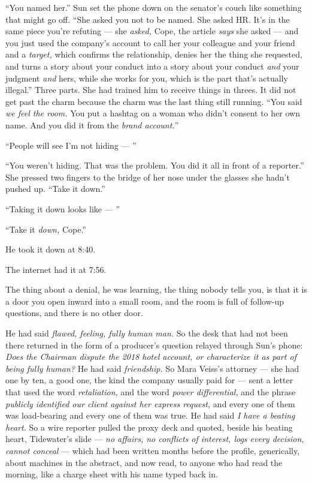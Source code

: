 \documentclass[11pt,openany]{book}
\newcommand{\scenebreak}{\par\vspace{0.5\baselineskip}\begin{center}\textasteriskcentered\quad\textasteriskcentered\quad\textasteriskcentered\end{center}\vspace{0.5\baselineskip}\par}
\begin{document}
``You named her.'' Sun set the phone down on the senator's couch like something that might go off. ``She asked you not to be named. She asked HR. It's in the same piece you're refuting --- she \textit{asked,} Cope, the article \textit{says} she asked --- and you just used the company's account to call her your colleague and your friend and a \textit{target,} which confirms the relationship, denies her the thing she requested, and turns a story about your conduct into a story about your conduct \textit{and} your judgment \textit{and} hers, while she works for you, which is the part that's actually illegal.'' Three parts. She had trained him to receive things in threes. It did not get past the charm because the charm was the last thing still running. ``You said \textit{we feel the room.} You put a hashtag on a woman who didn't consent to her own name. And you did it from the \textit{brand account.}''

``People will see I'm not hiding --- ''

``You weren't hiding. That was the problem. You did it all in front of a reporter.'' She pressed two fingers to the bridge of her nose under the glasses she hadn't pushed up. ``Take it down.''

``Taking it down looks like --- ''

``Take it \textit{down,} Cope.''

He took it down at 8:40.

The internet had it at 7:56.


\scenebreak


The thing about a denial, he was learning, the thing nobody tells you, is that it is a door you open inward into a small room, and the room is full of follow-up questions, and there is no other door.

He had said \textit{flawed, feeling, fully human man.} So the desk that had not been there returned in the form of a producer's question relayed through Sun's phone: \textit{Does the Chairman dispute the 2018 hotel account, or characterize it as part of being fully human?} He had said \textit{friendship.} So Mara Veiss's attorney --- she had one by ten, a good one, the kind the company usually paid for --- sent a letter that used the word \textit{retaliation,} and the word \textit{power differential,} and the phrase \textit{publicly identified our client against her express request,} and every one of them was load-bearing and every one of them was true. He had said \textit{I have a beating heart.} So a wire reporter pulled the proxy deck and quoted, beside his beating heart, Tidewater's slide --- \textit{no affairs, no conflicts of interest, logs every decision, cannot conceal} --- which had been written months before the profile, generically, about machines in the abstract, and now read, to anyone who had read the morning, like a charge sheet with his name typed back in.
\end{document}
